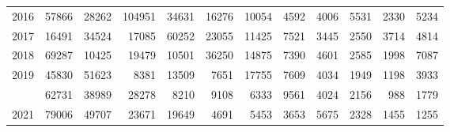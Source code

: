 \documentclass[
]{article}
\begin{document}
\begin{longtable}[t]{lrrrrrrrrrrr}
2016 & 57866 & 28262 & 104951 & 34631 & 16276 & 10054 & 4592 & 4006 & 5531 & 2330 & 5234\\
2017 & 16491 & 34524 & 17085 & 60252 & 23055 & 11425 & 7521 & 3445 & 2550 & 3714 & 4814\\
2018 & 69287 & 10425 & 19479 & 10501 & 36250 & 14875 & 7390 & 4601 & 2585 & 1998 & 7087\\
2019 & 45830 & 51623 & 8381 & 13509 & 7651 & 17755 & 7609 & 4034 & 1949 & 1198 & 3933\\
\addlinespace
2020 & 62731 & 38989 & 28278 & 8210 & 9108 & 6333 & 9561 & 4024 & 2156 & 988 & 1779\\
2021 & 79006 & 49707 & 23671 & 19649 & 4691 & 5453 & 3653 & 5675 & 2328 & 1455 & 1255\\*
\end{longtable}
\end{document}
